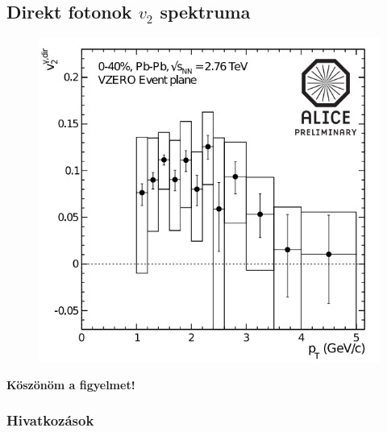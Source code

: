 \documentclass{beamer}
\begin{document}
\subsection{Direkt fotonok $v_2$ spektruma}
\begin{frame}
\begin{center}
\begin{figure}[H]
	\centering
    		\includegraphics[scale=0.4]{pic/v2_dirphoton}
\end{figure}
\end{center}
\end{frame}


\begin{frame}
\begin{center}
\textbf{Köszönöm a figyelmet!}
\end{center}
\end{frame}


\begin{frame}[noframenumbering]
\frametitle{Hivatkozások}
\end{frame}
\end{document}
